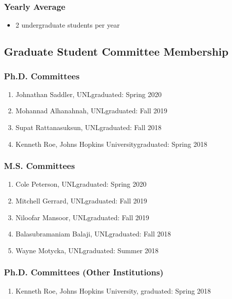 \documentclass[11pt]{article}
\begin{document}
{  \subsubsection{Yearly Average}
  \begin{itemize}
  \item 2 undergraduate students per year  %
  \end{itemize}


  \subsection{Graduate Student Committee Membership}
  \subsubsection{Ph.D. Committees}
  \begin{enumerate}
  \item Johnathan Saddler, UNL\hfill graduated: Spring 2020
  \item Mohannad Alhanahnah, UNL\hfill graduated: Fall 2019
  \item Supat Rattanasuksun, UNL\hfill graduated: Fall 2018
  \item Kenneth Roe,  Johns Hopkins University\hfill graduated: Spring 2018
  \end{enumerate}

  \subsubsection{M.S. Committees}
  \begin{enumerate}
  \item Cole Peterson, UNL\hfill graduated: Spring 2020
  \item Mitchell Gerrard, UNL\hfill graduated: Fall 2019
  \item Niloofar Mansoor, UNL\hfill graduated: Fall 2019
  \item Balasubramaniam Balaji, UNL\hfill graduated: Fall 2018
  \item Wayne Motycka, UNL\hfill graduated: Summer 2018
  \end{enumerate}


  \subsubsection{Ph.D. Committees (Other Institutions)}
  \begin{enumerate}
  \item Kenneth Roe,  Johns Hopkins University,  graduated: Spring 2018
  \end{enumerate}

}
\end{document}
